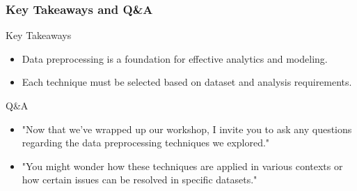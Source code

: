\documentclass{beamer}
\begin{document}
\begin{frame}[fragile]
    \frametitle{Key Takeaways and Q\&A}
    \begin{block}{Key Takeaways}
        \begin{itemize}
            \item Data preprocessing is a foundation for effective analytics and modeling.
            \item Each technique must be selected based on dataset and analysis requirements.
        \end{itemize}
    \end{block}

    \begin{block}{Q\&A}
        \begin{itemize}
            \item "Now that we've wrapped up our workshop, I invite you to ask any questions regarding the data preprocessing techniques we explored."
            \item "You might wonder how these techniques are applied in various contexts or how certain issues can be resolved in specific datasets."
        \end{itemize}
    \end{block}
\end{frame}
\end{document}
